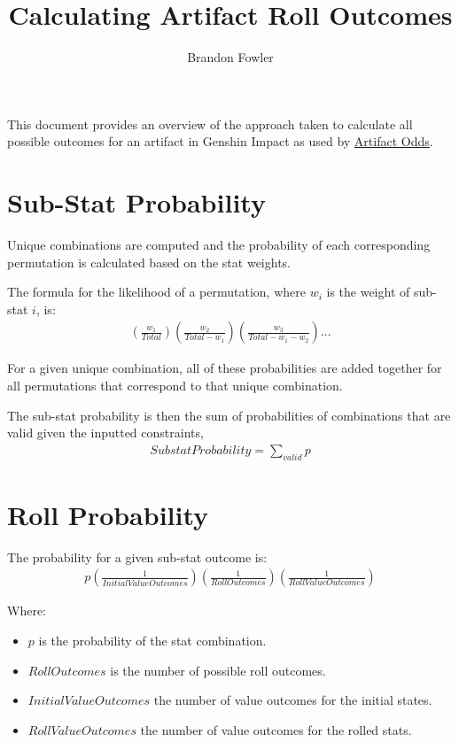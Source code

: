 \documentclass[12pt]{article}
\title{Calculating Artifact Roll Outcomes}
\author{Brandon Fowler}
\begin{document}
	
\maketitle

This document provides an overview of the approach taken to calculate all possible outcomes for an artifact in Genshin Impact as used by \href{https://www.brandonfowler.me/artifact-odds/}{Artifact Odds}.

\tableofcontents
\pagebreak

\section{Sub-Stat Probability}
	
Unique combinations are computed and the probability of each corresponding permutation is calculated based on the stat weights.

The formula for the likelihood of a permutation, where $w_i$ is the weight of sub-stat $i$, is:
\begin{align*}
	\left(\frac{w_1}{Total}\right)\left(\frac{w_2}{Total - w_1}\right)\left(\frac{w_3}{Total - w_1 - w_2}\right)\dots
\end{align*}

For a given unique combination, all of these probabilities are added together for all permutations that correspond to that unique combination.

The sub-stat probability is then the sum of probabilities of combinations that are valid given the inputted constraints,
\begin{align*}
	SubstatProbability = \sum_{valid} p
\end{align*}
	
\section{Roll Probability}

The probability for a given sub-stat outcome is:
\begin{align*}
	p\left(\frac{1}{InitialValueOutcomes}\right)\left(\frac{1}{RollOutcomes}\right)\left(\frac{1}{RollValueOutcomes}\right)
\end{align*}

Where:
\begin{itemize}[]
	\item $p$ is the probability of the stat combination.
	\item $RollOutcomes$ is the number of possible roll outcomes.
	\item $InitialValueOutcomes$ the number of value outcomes for the initial states.
	\item $RollValueOutcomes$ the number of value outcomes for the rolled stats.
\end{itemize}
\end{document}
